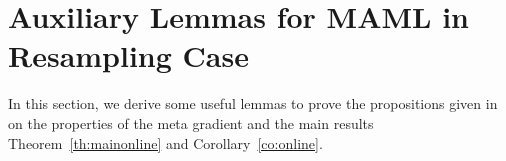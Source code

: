 \documentclass{osudissert96}
\begin{document}
\section{Auxiliary Lemmas for MAML in Resampling Case}
\label{aux:lemma}

In this section, we derive some useful lemmas  to prove the propositions given in   on the properties of the meta gradient and the main results Theorem~\ref{th:mainonline} and Corollary~\ref{co:online}. 
\end{document}
